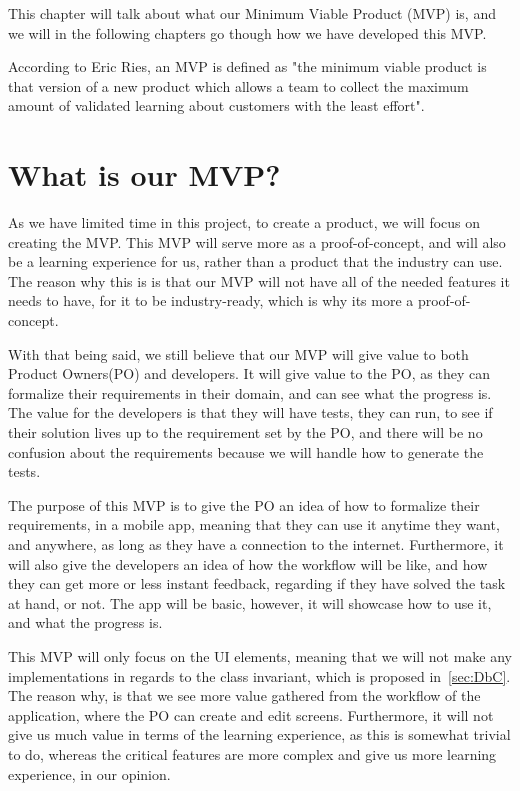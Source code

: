 This chapter will talk about what our Minimum Viable Product (MVP) is, and we will in the following chapters go though how we have developed this MVP.

According to Eric Ries, an MVP is defined as "the minimum viable product is that version of a new product which allows a team to collect the maximum amount of validated learning about customers with the least effort"\cite{whatIsMVP}.

\section{What is our MVP?}
As we have limited time in this project, to create a product, we will focus on creating the MVP.
This MVP will serve more as a proof-of-concept, and will also be a learning experience for us, rather than a product that the industry can use.
The reason why this is is that our MVP will not have all of the needed features it needs to have, for it to be industry-ready, which is why its more a proof-of-concept.

With that being said, we still believe that our MVP will give value to both Product Owners(PO) and developers.
It will give value to the PO, as they can formalize their requirements in their domain, and can see what the progress is.
The value for the developers is that they will have tests, they can run, to see if their solution lives up to the requirement set by the PO, and there will be no confusion about the requirements because we will handle how to generate the tests. 

The purpose of this MVP is to give the PO an idea of how to formalize their requirements, in a mobile app, meaning that they can use it anytime they want, and anywhere, as long as they have a connection to the internet.
Furthermore, it will also give the developers an idea of how the workflow will be like, and how they can get more or less instant feedback, regarding if they have solved the task at hand, or not. 
The app will be basic, however, it will showcase how to use it, and what the progress is. 

This MVP will only focus on the UI elements, meaning that we will not make any implementations in regards to the class invariant, which is proposed in~\autoref{sec:DbC}.
The reason why, is that we see more value gathered from the workflow of the application, where the PO can create and edit screens.
Furthermore, it will not give us much value in terms of the learning experience, as this is somewhat trivial to do, whereas the critical features are more complex and give us more learning experience, in our opinion.

